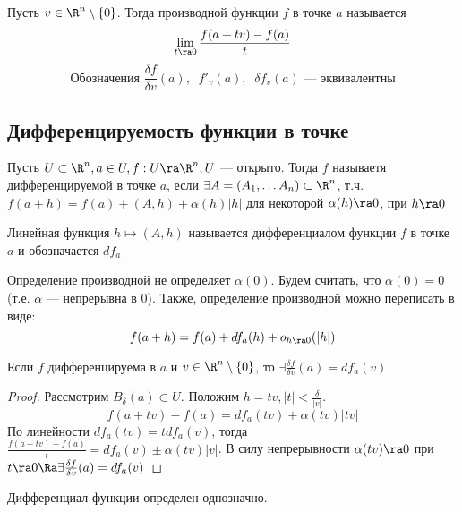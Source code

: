 \begin{definition}
    Пусть \(v \in \R^n \setminus \{0\}\). Тогда производной функции \(f\) в точке \(a\) называется 
    \[\lim_{t \ra 0} \frac{f(a + tv) - f(a)}{t}\]
    \[\text{Обозначения }\frac{\delta f}{\delta v}(a),\;\;f'_v(a),\;\;\delta f_v(a)\text{ --- эквивалентны}\]
\end{definition}

\subsection{Дифференцируемость функции в точке}
\begin{definition}
    Пусть \(U \subset \R^n, a \in U, f: U \ra \R^n, U\) --- открыто. Тогда \(f\) называетя дифференцируемой в точке \(a\), если \(\exists A = (A_1, \dots A_n) \subset \R^n\), т.ч. \(f(a + h) = f(a) + (A, h) + \alpha(h)|h|\) для некоторой \(\alpha(h) \ra 0\), при \(h \ra 0\)
\end{definition}

\begin{definition}
    Линейная функция \(h \mapsto (A, h)\) называется дифференциалом функции \(f\) в точке \(a\) и обозначается \(df_a\)
\end{definition}

\begin{note}
    Определение производной не определяет \(\alpha(0)\). Будем считать, что \(\alpha(0) = 0\) (т.е. \(\alpha\) --- непрерывна в \(0\)). Также, определение производной можно переписать в виде:
    \[f(a + h) = f(a) + df_a(h) + o_{h \ra 0}(|h|)\]
\end{note}

\begin{theorem}
    Если \(f\) дифференцируема в \(a\) и \(v \in \R^n \setminus \{0\}\), то \(\exists \frac{\delta f}{\delta v}(a) = df_a(v)\)
\end{theorem}
\begin{proof}
    Рассмотрим \(B_\delta(a) \subset U\). Положим \(h = tv, |t| < \frac{\delta}{|v|}\).
    \[f(a + tv) - f(a) = df_a(tv) + \alpha(tv)|tv|\]
    По линейности \(df_a(tv) = tdf_a(v)\), тогда \(\frac{f(a + tv) - f(a)}{t} = df_a(v) \pm \alpha(tv)|v|\). В силу непрерывности \(\alpha(tv) \ra 0\) при \(t \ra 0 \Ra \exists \frac{\delta f}{\delta v}(a) = df_a(v)\)
\end{proof}

\begin{corollary}
    Дифференциал функции определен однозначно.
\end{corollary}